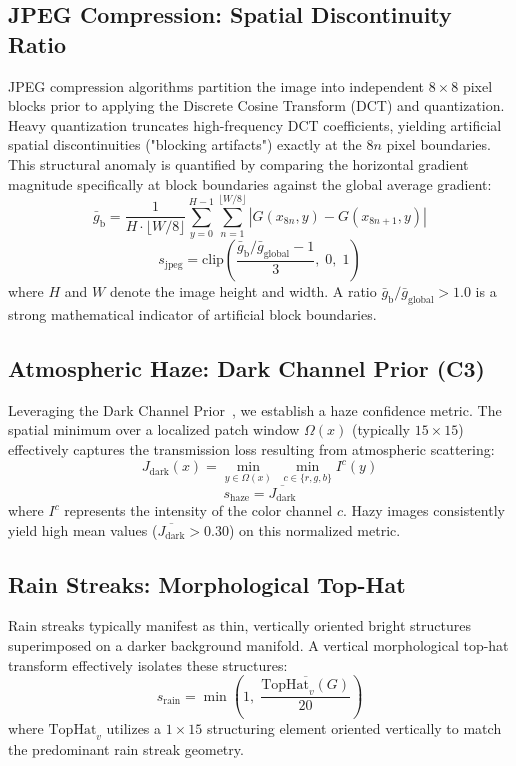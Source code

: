 \documentclass[journal, 10pt]{IEEEtran}
\begin{document}
\subsection{JPEG Compression: Spatial Discontinuity Ratio}
JPEG compression algorithms partition the image into independent $8\times8$ pixel blocks prior to applying the Discrete Cosine Transform (DCT) and quantization. Heavy quantization truncates high-frequency DCT coefficients, yielding artificial spatial discontinuities ("blocking artifacts") exactly at the $8n$ pixel boundaries. This structural anomaly is quantified by comparing the horizontal gradient magnitude specifically at block boundaries against the global average gradient:
\begin{equation} \label{eq:jpeg_grad}
    \bar{g}_{\text{b}} = \frac{1}{H \cdot \lfloor W/8 \rfloor} \sum_{y=0}^{H-1} \sum_{n=1}^{\lfloor W/8 \rfloor} |G(x_{8n}, y) - G(x_{8n+1}, y)|
\end{equation}
\begin{equation} \label{eq:jpeg_conf}
    s_{\text{jpeg}} = \text{clip}\!\left(\frac{\bar{g}_{\text{b}} / \bar{g}_{\text{global}} - 1}{3},\; 0,\; 1\right)
\end{equation}
where $H$ and $W$ denote the image height and width. A ratio $\bar{g}_{\text{b}} / \bar{g}_{\text{global}} > 1.0$ is a strong mathematical indicator of artificial block boundaries.

\subsection{Atmospheric Haze: Dark Channel Prior (C3)}
Leveraging the Dark Channel Prior~\cite{he2011dcp}, we establish a haze confidence metric. The spatial minimum over a localized patch window $\Omega(x)$ (typically $15\times15$) effectively captures the transmission loss resulting from atmospheric scattering:
\begin{equation} \label{eq:haze_dark}
    J_{\text{dark}}(x) = \min_{y \in \Omega(x)}\; \min_{c \in \{r,g,b\}} I^c(y)
\end{equation}
\begin{equation} \label{eq:haze_conf}
    s_{\text{haze}} = \overline{J_{\text{dark}}}
\end{equation}
where $I^c$ represents the intensity of the color channel $c$. Hazy images consistently yield high mean values ($\overline{J_{\text{dark}}} > 0.30$) on this normalized metric.

\subsection{Rain Streaks: Morphological Top-Hat}
Rain streaks typically manifest as thin, vertically oriented bright structures superimposed on a darker background manifold. A vertical morphological top-hat transform effectively isolates these structures:
\begin{equation} \label{eq:rain_conf}
    s_{\text{rain}} = \min\!\left(1,\; \frac{\overline{\text{TopHat}_v(G)}}{20}\right)
\end{equation}
where $\text{TopHat}_v$ utilizes a $1\times15$ structuring element oriented vertically to match the predominant rain streak geometry.
\end{document}
